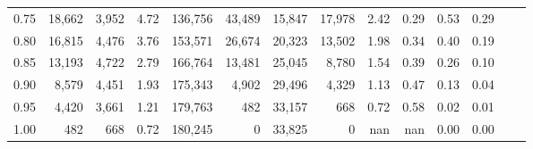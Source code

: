 \begin{tabular}{rrrrrrrrrrrrrr}
0.75 &  18,662 &  3,952 &    4.72 &  136,756 &   43,489 &  15,847 &  17,978 &  2.42 &  0.29 &  0.53 &      0.29 \\
0.80 &  16,815 &  4,476 &    3.76 &  153,571 &   26,674 &  20,323 &  13,502 &  1.98 &  0.34 &  0.40 &      0.19 \\
0.85 &  13,193 &  4,722 &    2.79 &  166,764 &   13,481 &  25,045 &   8,780 &  1.54 &  0.39 &  0.26 &      0.10 \\
0.90 &   8,579 &  4,451 &    1.93 &  175,343 &    4,902 &  29,496 &   4,329 &  1.13 &  0.47 &  0.13 &      0.04 \\
0.95 &   4,420 &  3,661 &    1.21 &  179,763 &      482 &  33,157 &     668 &  0.72 &  0.58 &  0.02 &      0.01 \\
1.00 &     482 &    668 &    0.72 &  180,245 &        0 &  33,825 &       0 &   nan &   nan &  0.00 &      0.00 \\
\bottomrule
\end{tabular}
